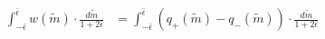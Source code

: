 \documentclass{article}
\begin{document}
\begin{align}
\int_{-\bar{\epsilon}}^{\bar{\epsilon}}{w(\tilde{m})\cdot\frac{d\tilde{m}}{1+2\bar{\epsilon}}}&=\int_{-\bar{\epsilon}}^{\bar{\epsilon}}{(q_{+}(\tilde{m})-q_{-}(\tilde{m}))\cdot\frac{d\tilde{m}}{1+2\bar{\epsilon}}}
\end{align}
\end{document}
